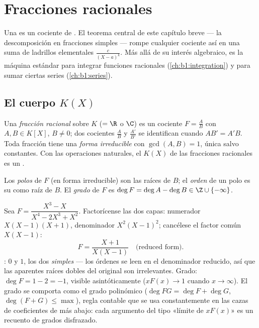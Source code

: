 \chapter{Fracciones racionales}\label{ch:b1:fractions}

Una  es un cociente de . El teorema
central de este capítulo breve --- la descomposición en fracciones
simples --- rompe cualquier
cociente así en una suma de ladrillos elementales
$\frac{c}{(X - a)^k}$. Más allá de su interés algebraico, es la máquina
estándar para integrar funciones racionales (\cref{ch:b1:integration})
y para sumar ciertas series (\cref{ch:b1:series}).

\section{El cuerpo $K(X)$}

\begin{definition}\label{def:b1:fractions:field}
Una \emph{fracción racional} sobre $K$ ($= \R$
o $\C$) es un cociente $F = \frac{A}{B}$ con $A, B \in K[X]$,
$B \neq 0$; dos cocientes $\frac AB$ y $\frac{A'}{B'}$ se identifican
cuando $AB' = A'B$. Toda fracción tiene una \emph{forma irreducible}
con $\gcd(A, B) = 1$, única salvo constantes. Con las operaciones
naturales, el  $K(X)$ de las fracciones racionales es un .

Los \emph{polos} de $F$ (en forma irreducible) son las
raíces de $B$; el \emph{orden} de un polo es su  como raíz
de $B$. El \emph{grado} de $F$ es
$\deg F = \deg A - \deg B \in \Z \cup \{-\infty\}$.
\end{definition}

\begin{example}\label{ex:b1:fractions:vocab}
Sea $F = \dfrac{X^3 - X}{X^4 - 2X^3 + X^2}$. Factorícense las dos
capas: numerador $X(X-1)(X+1)$, denominador $X^2(X-1)^2$; cancélese el
factor común $X(X-1)$:
\[
F = \frac{X + 1}{X(X - 1)} \quad\text{(reduced form).}
\]
: $0$ y $1$, los dos \emph{simples} --- los órdenes se leen en
el denominador reducido, así que las aparentes raíces dobles del
original son irrelevantes. Grado: $\deg F = 1 - 2 = -1$, visible
asintóticamente ($xF(x) \to 1$ cuando $x \to \infty$). El grado se
comporta como el grado polinómico ($\deg FG = \deg F + \deg G$,
$\deg(F + G) \leq \max$), regla contable que se usa constantemente en
las cazas de coeficientes de más abajo: cada argumento del tipo
«límite de $xF(x)$» es un recuento de grados disfrazado.
\end{example}

